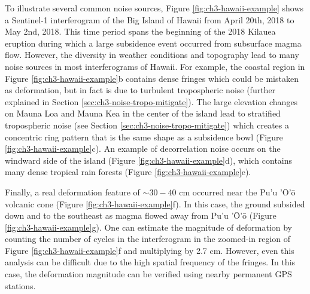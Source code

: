 To illustrate several common noise sources, Figure \ref{fig:ch3-hawaii-example} shows a Sentinel-1 interferogram of the Big Island of Hawaii from April 20th, 2018 to May 2nd, 2018. 
This time period spans the beginning of the 2018 Kilauea eruption during which a large subsidence event occurred from subsurface magma flow. However, the diversity in weather conditions and topography lead to many noise sources in most interferograms of Hawaii.
For example, the coastal region in Figure \ref{fig:ch3-hawaii-example}b contains dense fringes which could be mistaken as deformation, but in fact is due to turbulent tropospheric noise (further explained in Section \ref{sec:ch3-noise-tropo-mitigate}).
The large elevation changes on Mauna Loa and Mauna Kea in the center of the island lead to stratified tropospheric noise (see Section \ref{sec:ch3-noise-tropo-mitigate}) which creates a concentric ring pattern that is the same shape as a subsidence bowl (Figure \ref{fig:ch3-hawaii-example}c).
An example of decorrelation noise occurs on the windward side of the island (Figure \ref{fig:ch3-hawaii-example}d), which contains many dense tropical rain forests (Figure \ref{fig:ch3-hawaii-example}e). 

Finally, a real deformation feature of $ \sim 30-40 $ cm occurred near the Pu'u '\=O'\=o volcanic cone (Figure \ref{fig:ch3-hawaii-example}f).
In this case, the ground subsided down and to the southeast as magma flowed away from Pu'u '\=O'\=o (Figure \ref{fig:ch3-hawaii-example}g).
One can estimate the magnitude of deformation by counting the number of cycles in the interferogram in the zoomed-in region of Figure \ref{fig:ch3-hawaii-example}f and multiplying by 2.7 cm.
However, even this analysis can be difficult due to the high spatial frequency of the fringes.
In this case, the deformation magnitude can be verified using nearby permanent GPS stations.


%



